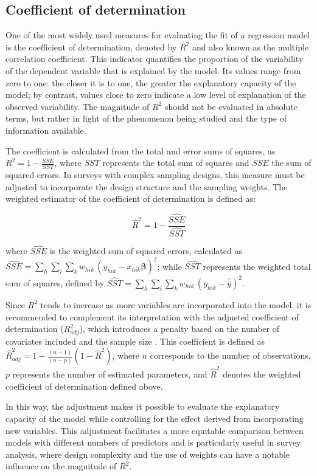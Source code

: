 \documentclass[
  english,
  12pt,
]{book}
\begin{document}
\subsection{Coefficient of determination}\label{coeficiente-de-determinacion}

One of the most widely used measures for evaluating the fit of a regression model is the coefficient of determination, denoted by \(R^{2}\) and also known as the multiple correlation coefficient. This indicator quantifies the proportion of the variability of the dependent variable that is explained by the model. Its values range from zero to one: the closer it is to one, the greater the explanatory capacity of the model; by contrast, values close to zero indicate a low level of explanation of the observed variability. The magnitude of \(R^{2}\) should not be evaluated in absolute terms, but rather in light of the phenomenon being studied and the type of information available.

The coefficient is calculated from the total and error sums of squares, as \(R^{2} = 1 - \frac{SSE}{SST}\), where \(SST\) represents the total sum of squares and \(SSE\) the sum of squared errors. In surveys with complex sampling designs, this measure must be adjusted to incorporate the design structure and the sampling weights. The weighted estimator of the coefficient of determination is defined as:

\[
\hat{R}^2 = 1 - \frac{\widehat{SSE}}{\widehat{SST}}
\]

where \(\widehat{SSE}\) is the weighted sum of squared errors, calculated as \(\widehat{SSE} = \sum_{h} \sum_{i} \sum_{k} w_{hik} \,(y_{hik} - x_{hik}\hat{\boldsymbol{\beta}})^2\); while \(\widehat{SST}\) represents the weighted total sum of squares, defined by \(\widehat{SST} = \sum_{h} \sum_{i} \sum_{k} w_{hik}\,(y_{hik} - \hat{\bar{y}})^2\).

Since \(R^{2}\) tends to increase as more variables are incorporated into the model, it is recommended to complement its interpretation with the adjusted coefficient of determination (\(R_{adj}^{2}\)), which introduces a penalty based on the number of covariates included and the sample size \citep{pfeffermann2011modelling}. This coefficient is defined as \(\hat{R}^2_{adj} = 1 - \frac{(n-1)}{(n-p)}(1 - \hat{R}^2)\), where \(n\) corresponds to the number of observations, \(p\) represents the number of estimated parameters, and \(\hat{R}^{2}\) denotes the weighted coefficient of determination defined above.

In this way, the adjustment makes it possible to evaluate the explanatory capacity of the model while controlling for the effect derived from incorporating new variables. This adjustment facilitates a more equitable comparison between models with different numbers of predictors and is particularly useful in survey analysis, where design complexity and the use of weights can have a notable influence on the magnitude of \(R^{2}\).
\end{document}
